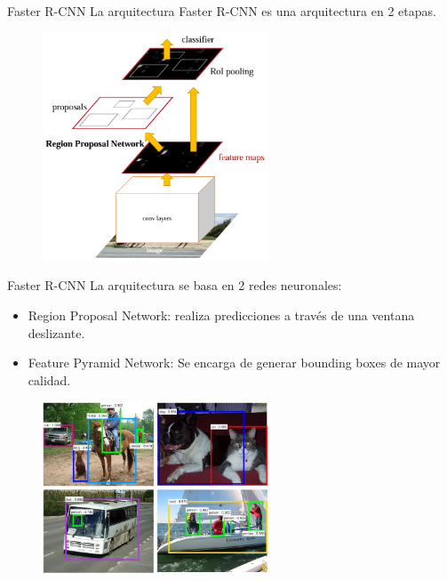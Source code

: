 \begin{frame}{Faster R-CNN}
La arquitectura \alert{Faster R-CNN}\cite{ren2015faster} es una arquitectura en \alert{2 etapas}.

\begin{figure}
    \centering
    \includegraphics[width=0.6\textwidth]{Slides/figures/Tema 4/FasterRCNN.png}
    \caption{\cite{ren2015faster}}
\end{figure}
\end{frame}

\begin{frame}{Faster R-CNN}
La arquitectura se basa en \alert{2 redes neuronales}:
\begin{itemize}
    \item \alert{Region Proposal Network}: realiza predicciones a través de una \alert{ventana deslizante}.
    \item \alert{Feature Pyramid Network}: Se encarga de generar bounding boxes de mayor calidad.
\end{itemize}

\begin{figure}
    \centering
    \includegraphics[width=0.6\textwidth]{Slides/figures/Tema 4/FasterRCNN_Results.png}
    \caption{\cite{ren2015faster}}
\end{figure}
\end{frame}

